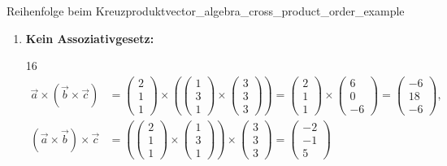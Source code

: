 \begin{ExampleBox}{Reihenfolge beim Kreuzprodukt}{vector_algebra_cross_product_order_example}
\begin{enumerate}[label=\alph*),leftmargin=*,itemsep=1em]
    \item \textbf{Kein Assoziativgesetz:}
      \begin{ClozeArea}[33]{16}
      \[
        \left.
        \begin{aligned}
          \vec a\times(\vec b\times\vec c)
            &=\begin{pmatrix}2\\1\\1\end{pmatrix}
              \times\left(
                \begin{pmatrix}1\\3\\1\end{pmatrix}
                \times\begin{pmatrix}3\\3\\3\end{pmatrix}
              \right)
              =\begin{pmatrix}2\\1\\1\end{pmatrix}
                \times\begin{pmatrix}6\\0\\-6\end{pmatrix}
              =\begin{pmatrix}-6\\18\\-6\end{pmatrix},\\[1em]
          (\vec a\times\vec b)\times\vec c
            &=\left(
                \begin{pmatrix}2\\1\\1\end{pmatrix}
                \times\begin{pmatrix}1\\3\\1\end{pmatrix}
              \right)
              \times\begin{pmatrix}3\\3\\3\end{pmatrix}
              =\begin{pmatrix}-2\\-1\\5\end{pmatrix}

\end{aligned}\]
\end{ClozeArea}
\end{enumerate}
\end{ExampleBox}
